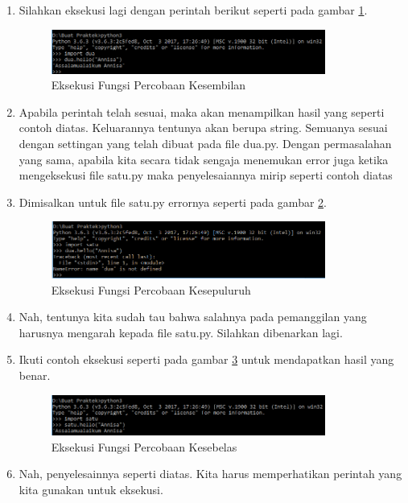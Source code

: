 \begin{enumerate}
\item Silahkan eksekusi lagi dengan perintah berikut seperti pada gambar \ref{fig:eksekusi_fungsi9}.
\begin{figure}[!htbp]
	\centerline{\includegraphics[width=0.85\textwidth]{figures/8/eksekusi_fungsi9.png}}
	\caption{Eksekusi Fungsi Percobaan Kesembilan}
	\label{fig:eksekusi_fungsi9}
\end{figure}
\item Apabila perintah telah sesuai, maka akan menampilkan hasil yang seperti contoh diatas. Keluarannya tentunya akan berupa string. Semuanya sesuai dengan settingan yang telah dibuat pada file dua.py. Dengan permasalahan yang sama, apabila kita secara tidak sengaja menemukan error juga ketika mengeksekusi file satu.py maka penyelesaiannya mirip seperti contoh diatas
\item Dimisalkan untuk file satu.py errornya seperti pada gambar \ref{fig:eksekusi_fungsi10}.
\begin{figure}[!htbp]
	\centerline{\includegraphics[width=0.85\textwidth]{figures/8/eksekusi_fungsi10.png}}
	\caption{Eksekusi Fungsi Percobaan Kesepuluruh}
	\label{fig:eksekusi_fungsi10}
\end{figure}
\item Nah, tentunya kita sudah tau bahwa salahnya pada pemanggilan yang harusnya mengarah kepada file satu.py. Silahkan dibenarkan lagi.
\item Ikuti contoh eksekusi seperti pada gambar \ref{fig:eksekusi_fungsi11} untuk mendapatkan hasil yang benar.
\begin{figure}[!htbp]
	\centerline{\includegraphics[width=0.85\textwidth]{figures/8/eksekusi_fungsi11.png}}
	\caption{Eksekusi Fungsi Percobaan Kesebelas}
	\label{fig:eksekusi_fungsi11}
\end{figure}
\item Nah, penyelesainnya seperti diatas. Kita harus memperhatikan perintah yang kita gunakan untuk eksekusi.
\end{enumerate}

